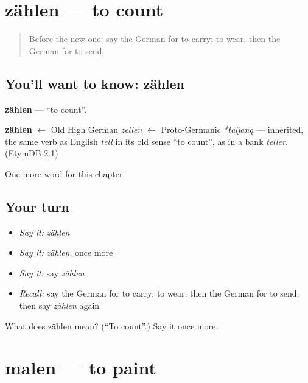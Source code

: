 \section[zählen]{zählen — to count}

\label{lesson:GE-C68-zaehlen}



\begin{quote}
Before the new one: say the German for to carry; to wear, then the German for to send.
\end{quote}

\subsection*{You'll want to know: zählen}
\textbf{zählen} — \textquotedblleft{}to count\textquotedblright{}.

\begin{cousinweb}
\textbf{zählen} $\leftarrow$ Old High German \emph{zellen} $\leftarrow$ Proto-Germanic \emph{*taljaną} — inherited, the same verb as English \emph{tell} in its old sense \textquotedblleft{}to count\textquotedblright{}, as in a bank \emph{teller}. (EtymDB 2.1)
\end{cousinweb}

\begin{grammarlens}[title={What you've built}]
One more word for this chapter.
\end{grammarlens}

\subsection*{Your turn}
\begin{itemize}
\raggedright
  \item \emph{Say it:} \emph{zählen}
  \item \emph{Say it:} \emph{zählen}, once more
  \item \emph{Say it:} say \emph{zählen}
  \item \emph{Recall:} say the German for to carry; to wear, then the German for to send, then say \emph{zählen} again
\end{itemize}

\begin{tcolorbox}[breakable,colback=teal!4,colframe=teal!35!black,title={Before you move on}]
What does zählen mean? (\textquotedblleft{}To count\textquotedblright{}.) Say it once more.
\end{tcolorbox}
\section[malen]{malen — to paint}

